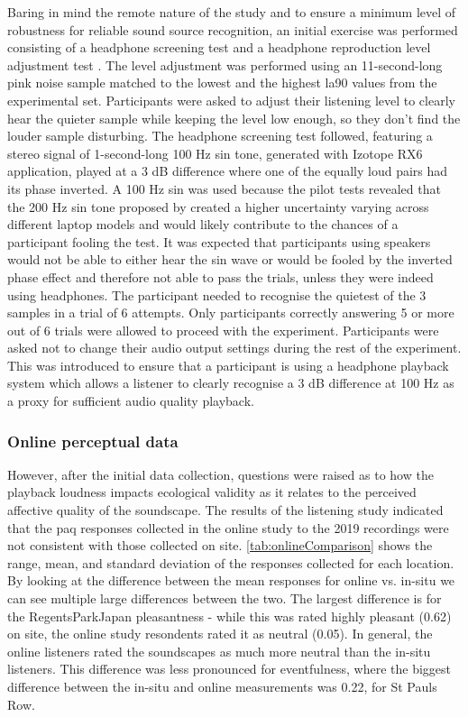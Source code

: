    Baring in mind the remote nature of the study and to ensure a minimum level of robustness for reliable sound source recognition, an initial exercise was performed consisting of a headphone screening test \citep{Woods2017Headphone} and a headphone reproduction level adjustment test \citep{Gontier2019Estimation}. The level adjustment was performed using an 11-second-long pink noise sample matched to the lowest and the highest \gls{la90} values from the experimental set. Participants were asked to adjust their listening level to clearly hear the quieter sample while keeping the level low enough, so they don't find the louder sample disturbing. The headphone screening test followed, featuring a stereo signal of 1-second-long 100 Hz sin tone, generated with Izotope RX6 application, played at a 3 dB difference where one of the equally loud pairs had its phase inverted. A 100 Hz sin was used because the pilot tests revealed that the 200 Hz sin tone proposed by \citet{Woods2017Headphone} created a higher uncertainty varying across different laptop models and would likely contribute to the chances of a participant fooling the test. It was expected that participants using speakers would not be able to either hear the sin wave or would be fooled by the inverted phase effect and therefore not able to pass the trials, unless they were indeed using headphones. The participant needed to recognise the quietest of the 3 samples in a trial of 6 attempts. Only participants correctly answering 5 or more out of 6 trials were allowed to proceed with the experiment. Participants were asked not to change their audio output settings during the rest of the experiment. This was introduced to ensure that a participant is using a headphone playback system which allows a listener to clearly recognise a 3 dB difference at 100 Hz as a proxy for sufficient audio quality playback.

   \subsubsection*{Online perceptual data}
   \label{sec:onlinePerceptualData}

   However, after the initial data collection, questions were raised as to how the playback loudness impacts ecological validity as it relates to the perceived affective quality of the soundscape. The results of the listening study indicated that the \gls{paq} responses collected in the online study to the 2019 recordings were not consistent with those collected on site. \cref{tab:onlineComparison} shows the range, mean, and standard deviation of the responses collected for each location. By looking at the difference between the mean responses for online vs. in-situ we can see multiple large differences between the two. The largest difference is for the RegentsParkJapan pleasantness - while this was rated highly pleasant (0.62) on site, the online study resondents rated it as neutral (0.05). In general, the online listeners rated the soundscapes as much more neutral than the in-situ listeners. This difference was less pronounced for eventfulness, where the biggest difference between the in-situ and online measurements was 0.22, for St Pauls Row.

